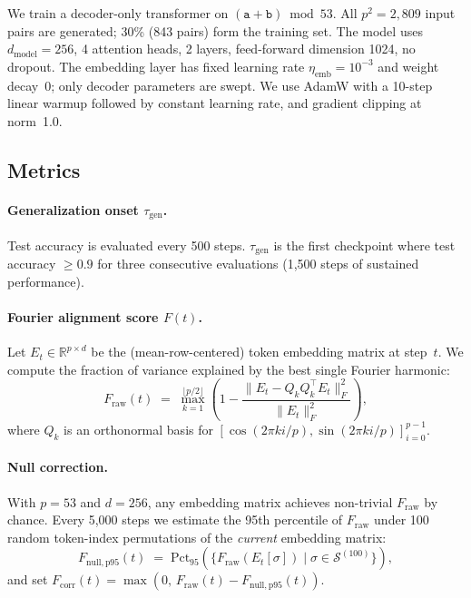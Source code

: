\documentclass{article}
\newcommand{\taug}{\tau_{\mathrm{gen}}}
\newcommand{\fcorr}{F_{\mathrm{corr}}}
\begin{document}
We train a decoder-only transformer \citep{vaswani2017attention} on
$(\mathtt{a}+\mathtt{b})\bmod 53$.
All $p^2=2{,}809$ input pairs are generated; 30\% (843 pairs) form
the training set.
The model uses $d_{\mathrm{model}}=256$, 4 attention heads, 2 layers,
feed-forward dimension 1024, no dropout.
The embedding layer has fixed learning rate $\eta_{\mathrm{emb}}
=10^{-3}$ and weight decay~0; only decoder parameters are swept.
We use AdamW with a 10-step linear warmup followed by constant
learning rate, and gradient clipping at norm~1.0.

\subsection{Metrics}

\paragraph{Generalization onset $\taug$.}
Test accuracy is evaluated every 500 steps.
$\taug$ is the first checkpoint where test accuracy $\geq 0.9$ for
three consecutive evaluations (1{,}500 steps of sustained
performance).

\paragraph{Fourier alignment score $F(t)$.}
Let $E_t \in \mathbb{R}^{p \times d}$ be the (mean-row-centered) token
embedding matrix at step~$t$.
We compute the fraction of variance explained by the best single
Fourier harmonic:
\begin{equation}
  F_{\mathrm{raw}}(t) \;=\; \max_{k=1}^{\lfloor p/2\rfloor}
  \!\left(1 - \frac{\|E_t - Q_k Q_k^\top E_t\|_F^2}
  {\|E_t\|_F^2}\right),
  \label{eq:f_raw}
\end{equation}
where $Q_k$ is an orthonormal basis for
$[\cos(2\pi ki/p),\sin(2\pi ki/p)]_{i=0}^{p-1}$.

\paragraph{Null correction.}
With $p=53$ and $d=256$, any embedding matrix achieves non-trivial
$F_{\mathrm{raw}}$ by chance.
Every 5{,}000 steps we estimate the 95th percentile of
$F_{\mathrm{raw}}$ under 100 random token-index permutations of the
\emph{current} embedding matrix:
\begin{equation}
  F_{\mathrm{null,p95}}(t) \;=\;
  \mathrm{Pct}_{95}\!\left(
    \{F_{\mathrm{raw}}(E_t[\sigma]) \mid \sigma\in\mathcal{S}^{(100)}\}
  \right),
\end{equation}
and set $\fcorr(t)=\max(0,\,F_{\mathrm{raw}}(t)-F_{\mathrm{null,p95}}(t))$.
\end{document}
